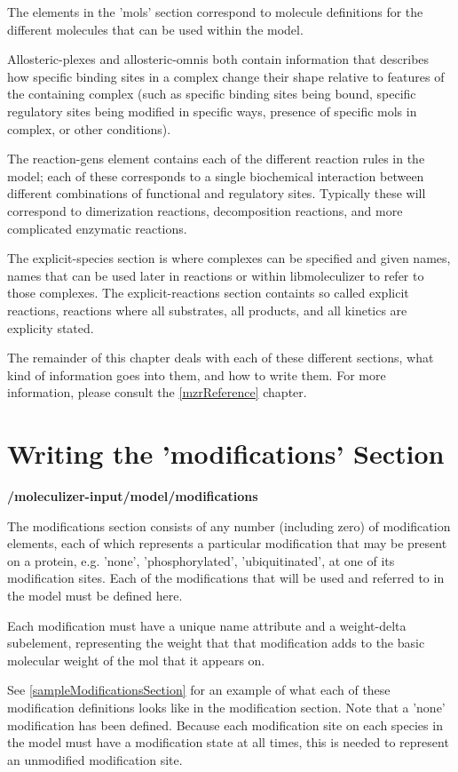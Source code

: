The elements in the 'mols' section correspond to molecule definitions for
the different molecules that can be used within the model.

Allosteric-plexes and allosteric-omnis both contain information that
describes how specific binding sites in a complex change their shape
relative to features of the containing complex (such as specific
binding sites being bound, specific regulatory sites being modified in
specific ways, presence of specific mols in complex, or other
conditions).  

The reaction-gens element contains each of the different reaction
rules in the model; each of these corresponds to a single biochemical
interaction between different combinations of functional and
regulatory sites.  Typically these will correspond to dimerization
reactions, decomposition reactions, and more complicated enzymatic
reactions. 
 
The explicit-species section is where complexes can be specified and
given names, names that can be used later in reactions or within
libmoleculizer to refer to those complexes.  The explicit-reactions
section containts so called explicit reactions, reactions where all
substrates, all products, and all kinetics are explicity stated.  

The remainder of this chapter deals with each of these different
sections, what kind of information goes into them, and how to write
them.  For more information, please consult the \ref{mzrReference}
chapter.

\section{Writing the 'modifications' Section}
\label{sec:modifications}

{\bf /moleculizer-input/model/modifications } 

The modifications section consists of any number (including zero) of
modification elements, each of which represents a particular
modification that may be present on a protein, e.g. 'none',
'phosphorylated', 'ubiquitinated', at one of its modification
sites. Each of the modifications that will be used and referred to in
the model must be defined here.

Each modification must have a unique name attribute and a weight-delta
subelement, representing the weight that that modification adds to the
basic molecular weight of the mol that it appears on.  

See \ref{sampleModificationsSection} for an example of what each of
these modification definitions looks like in the modification
section.  Note that a 'none' modification has been defined. Because
each modification site on each species in the model must have a
modification state at all times, this is needed to represent an
unmodified modification site.

